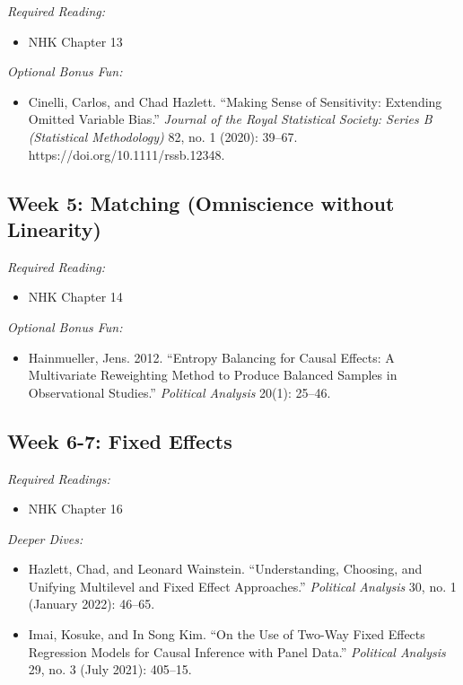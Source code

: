 \documentclass[11pt, letterpaper]{article}
\begin{document}
\textit{Required Reading:}

\begin{itemize}
	\item NHK Chapter 13
\end{itemize}


\noindent \textit{Optional Bonus Fun:}

\begin{itemize}
	\item Cinelli, Carlos, and Chad Hazlett. ``Making Sense of Sensitivity: Extending Omitted Variable Bias.'' \textit{Journal of the Royal Statistical Society: Series B (Statistical Methodology)} 82, no. 1 (2020): 39–67. https://doi.org/10.1111/rssb.12348.
\end{itemize}

\subsection*{Week 5: Matching (Omniscience without Linearity)}

\textit{Required Reading:}

\begin{itemize}
	\item NHK Chapter 14
\end{itemize}

\noindent \textit{Optional Bonus Fun:}

\begin{itemize}
	\item Hainmueller, Jens. 2012. ``Entropy Balancing for Causal Effects: A Multivariate Reweighting Method to Produce Balanced Samples in Observational Studies.'' \textit{Political Analysis} 20(1): 25–46.
\end{itemize}

\subsection*{Week 6-7: Fixed Effects}

\textit{Required Readings:}

\begin{itemize}
	\item NHK Chapter 16
\end{itemize}


\noindent \textit{Deeper Dives:}

\begin{itemize}
	\item Hazlett, Chad, and Leonard Wainstein. ``Understanding, Choosing, and Unifying Multilevel and Fixed Effect Approaches.'' \textit{Political Analysis} 30, no. 1 (January 2022): 46–65.
	\item Imai, Kosuke, and In Song Kim. ``On the Use of Two-Way Fixed Effects Regression Models for Causal Inference with Panel Data.'' \textit{Political Analysis} 29, no. 3 (July 2021): 405–15.
\end{itemize}
\end{document}
